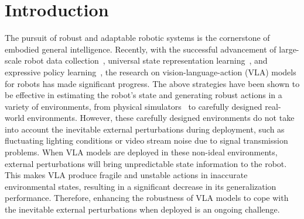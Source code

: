 \section{Introduction}
The pursuit of robust and adaptable robotic systems is the cornerstone of embodied general intelligence.
Recently, with the successful advancement of large-scale robot data collection~\citep{vuong2023open}, universal state representation learning~\citep{li2023vision,du2024learning}, and expressive policy learning~\citep{brohan2022rt,chi2023diffusion}, the research on vision-language-action (VLA) models for robots has made significant progress. 
The above strategies have been shown to be effective in estimating the robot's state and generating robust actions in a variety of environments, from physical simulators~\citep{mu2021maniskill,ding2023quar} to carefully designed real-world environments. 
However, these carefully designed environments do not take into account the inevitable external perturbations during deployment, such as fluctuating lighting conditions or video stream noise due to signal transmission problems. 
When VLA models are deployed in these non-ideal environments, external perturbations will bring unpredictable state information to the robot. 
This makes VLA produce fragile and unstable actions in inaccurate environmental states, resulting in a significant decrease in its generalization performance.
Therefore, enhancing the robustness of VLA models to cope with the inevitable external perturbations when deployed is an ongoing challenge. 

